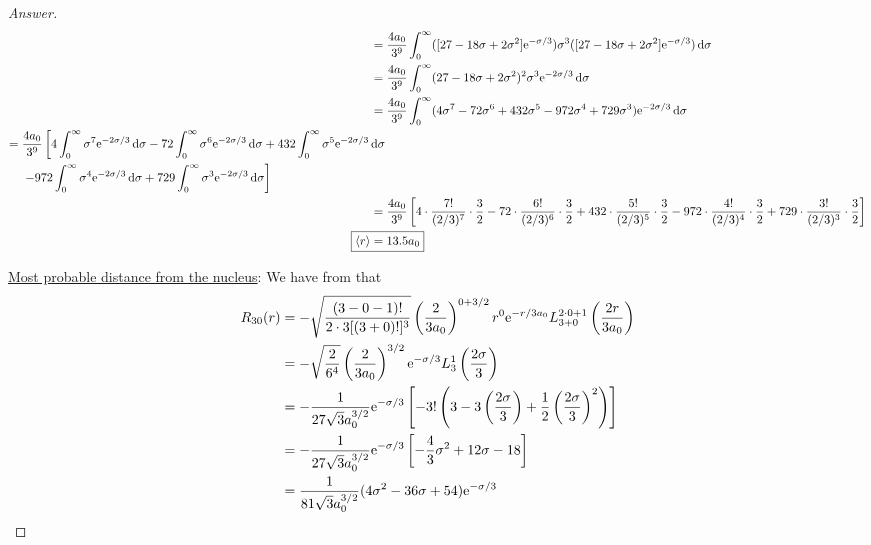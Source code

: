 \documentclass[../psets.tex]{subfiles}
\begin{document}
\begin{enumerate}
\begin{enumerate}
\begin{proof}[Answer]
\begin{align*}
                ={}& \frac{4a_0}{3^9}\int_0^\infty([27-18\sigma+2\sigma^2]\e[-\sigma/3])\sigma^3([27-18\sigma+2\sigma^2]\e[-\sigma/3])\dd{\sigma}\\
                ={}& \frac{4a_0}{3^9}\int_0^\infty(27-18\sigma+2\sigma^2)^2\sigma^3\e[-2\sigma/3]\dd{\sigma}\\
                ={}& \frac{4a_0}{3^9}\int_0^\infty(4\sigma^7-72\sigma^6+432\sigma^5-972\sigma^4+729\sigma^3)\e[-2\sigma/3]\dd{\sigma}\\
                \begin{split}
                    ={}& \frac{4a_0}{3^9}\left[ 4\int_0^\infty\sigma^7\e[-2\sigma/3]\dd{\sigma}-72\int_0^\infty\sigma^6\e[-2\sigma/3]\dd{\sigma}+432\int_0^\infty\sigma^5\e[-2\sigma/3]\dd{\sigma}\right.\\
                    & \left.-972\int_0^\infty\sigma^4\e[-2\sigma/3]\dd{\sigma}+729\int_0^\infty\sigma^3\e[-2\sigma/3]\dd{\sigma} \right]
                \end{split}\\
                ={}& \frac{4a_0}{3^9}\left[ 4\cdot\frac{7!}{(2/3)^7}\cdot\frac{3}{2}-72\cdot\frac{6!}{(2/3)^6}\cdot\frac{3}{2}+432\cdot\frac{5!}{(2/3)^5}\cdot\frac{3}{2}-972\cdot\frac{4!}{(2/3)^4}\cdot\frac{3}{2}+729\cdot\frac{3!}{(2/3)^3}\cdot\frac{3}{2} \right]\\
                \Aboxed{\prb{r} ={}& 13.5a_0}
            \end{align*}\par
            \underline{Most probable distance from the nucleus}: We have from \textcite{bib:McQuarrieSimon} that
            \begin{align*}
                R_{30}(r) &= -\sqrt{\frac{(3-0-1)!}{2\cdot 3[(3+0)!]^3}}\left( \frac{2}{3a_0} \right)^{0+3/2}r^0\e[-r/3a_0]L_{3+0}^{2\cdot 0+1}\left( \frac{2r}{3a_0} \right)\\
                &= -\sqrt{\frac{2}{6^4}}\left( \frac{2}{3a_0} \right)^{3/2}\e[-\sigma/3]L_3^1\left( \frac{2\sigma}{3} \right)\\
                &= -\frac{1}{27\sqrt{3}a_0^{3/2}}\e[-\sigma/3]\left[ -3!\left( 3-3\left( \frac{2\sigma}{3} \right)+\frac{1}{2}\left( \frac{2\sigma}{3} \right)^2 \right) \right]\\
                &= -\frac{1}{27\sqrt{3}a_0^{3/2}}\e[-\sigma/3]\left[ -\frac{4}{3}\sigma^2+12\sigma-18 \right]\\
                &= \frac{1}{81\sqrt{3}a_0^{3/2}}(4\sigma^2-36\sigma+54)\e[-\sigma/3]
            \end{align*}

\end{proof}
\end{enumerate}
\end{enumerate}
\end{document}
